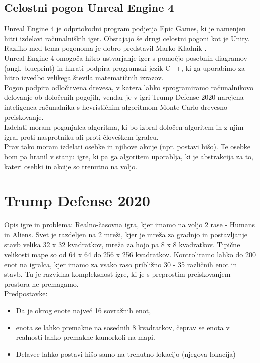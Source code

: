 \documentclass[a4paper, 12pt]{book}
\begin{document}
\subsection{Celostni pogon Unreal Engine 4}
Unreal Engine 4 je odprtokodni program podjetja Epic Games, ki je namenjen hitri izdelavi računalniških iger. Obstajajo še drugi celostni pogoni kot je Unity.\\
Razliko med tema pogonoma je dobro predstavil Marko Kladnik \cite{diploma2}.\\
Unreal Engine 4 omogoča hitro ustvarjanje iger s pomočjo posebnih diagramov (angl. blueprint) in hkrati podpira programski jezik C++, ki ga uporabimo za hitro izvedbo velikega števila matematičnih izrazov.\\
Pogon podpira odločitvena drevesa, v katera lahko sprogramiramo računalnikovo delovanje ob določenih pogojih, vendar je v igri Trump Defense 2020 narejena inteligenca računalnika s hevrističnim algoritmom Monte-Carlo drevesno preiskovanje.\\
Izdelati moram poganjalca algoritma, ki bo izbral določen algoritem in z njim igral proti nasprotniku ali proti človeškem igralcu.\\
Prav tako moram izdelati osebke in njihove akcije (npr. postavi hišo).
Te osebke bom pa hranil v stanju igre, ki pa ga algoritem uporablja, ki je abstrakcija za to, kateri osebki in akcije so trenutno na voljo.

\section{Trump Defense 2020}
Opis igre in problema:
Realno-časovna igra, kjer imamo na voljo 2 rase - Humans in Aliens.
Svet je razdeljen na 2 mreži, kjer je mreža za gradnjo in postavljanje stavb velika 32 x 32 kvadratkov, mreža za hojo pa 8 x 8 kvadratkov. Tipične velikosti mape so od 64 x 64 do 256 x 256 kvadratkov. Kontroliramo lahko do 200 enot na igralca, kjer imamo za vsako raso približno 30 - 35 različnih enot in stavb. Tu je razvidna kompleksnost igre, ki je s preprostim preiskovanjem prostora ne premagamo.\\
Predpostavke:
\begin{itemize}
\item Da je okrog enote največ 16 sovražnih enot,
\item enota se lahko premakne na sosednih 8 kvadratkov, čeprav se enota v realnosti lahko  premakne kamorkoli na mapi.
\item Delavec lahko postavi hišo samo na trenutno lokacijo (njegova lokacija)
\end{itemize}
\end{document}
